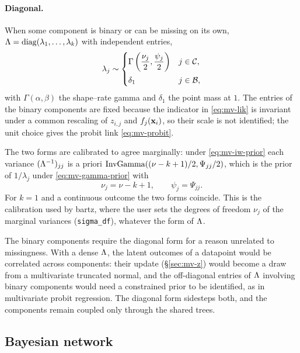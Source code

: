 \paragraph{Diagonal.}
When some component is binary or can be missing on its own,
$\Lambda = \operatorname{diag}(\lambda_1, \dots, \lambda_k)$ with independent entries,
\begin{equation}
	\label{eq:mv-gamma-prior}
	\lambda_j \sim
	\begin{cases}
		\Gamma\left(\dfrac{\nu_j}{2}, \dfrac{\psi_j}{2}\right) & j \in \mathcal{C}, \\[2ex]
		\delta_1                                               & j \in \mathcal{B},
	\end{cases}
\end{equation}
with $\Gamma(\alpha, \beta)$ the shape--rate gamma and $\delta_1$ the point
mass at $1$. The entries of the binary components are fixed because the
indicator in \eqref{eq:mv-lik} is invariant under a common rescaling of
$z_{i,j}$ and $f_j(\mathbf{x}_i)$, so their scale is not identified; the unit choice
gives the probit link \eqref{eq:mv-probit}.

The two forms are calibrated to agree marginally: under \eqref{eq:mv-iw-prior}
each variance $(\Lambda^{-1})_{jj}$ is a priori
$\mathrm{InvGamma}((\nu - k + 1)/2, \Psi_{jj}/2)$, which is the prior of $1/\lambda_j$
under \eqref{eq:mv-gamma-prior} with
\begin{equation}
	\label{eq:mv-gamma-match}
	\nu_j = \nu - k + 1,
	\qquad
	\psi_j = \Psi_{jj}.
\end{equation}
For $k = 1$ and a continuous outcome the two forms coincide. This is the
calibration used by bartz, where the user sets the degrees of freedom
$\nu_j$ of the marginal variances (\texttt{sigma\_df}), whatever the form
of $\Lambda$.

The binary components require the diagonal form for a reason unrelated to
missingness. With a dense $\Lambda$, the latent outcomes of a datapoint would be
correlated across components: their update (\S\ref{sec:mv-z}) would become
a draw from a multivariate truncated normal, and the off-diagonal entries of
$\Lambda$ involving binary components would need a constrained prior to be
identified, as in multivariate probit regression. The diagonal form
sidesteps both, and the components remain coupled only through the shared
trees.

\subsection{Bayesian network}
\label{sec:mv-bn}

